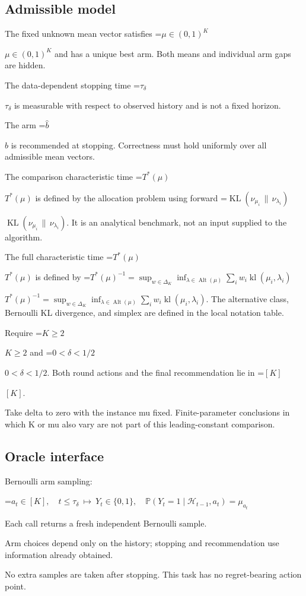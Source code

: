 \documentclass[10pt,a4paper]{article}
\newcommand{\AtlasMath}[1]{\par\begingroup\centering\setbox0=\hbox{$\displaystyle #1$}\ifdim\wd0>1.4\linewidth\typeout{ATLAS WIDE FORMULA: \the\wd0}\fi\ifdim\wd0>\linewidth\resizebox{\linewidth}{!}{\box0}\else\box0\fi\par\endgroup}
\newcommand{\AtlasInlineMath}[1]{\begingroup\setbox0=\hbox{$#1$}\ifdim\wd0>.4\linewidth\endgroup\AtlasMath{#1}\else\endgroup$#1$\fi}
\begin{document}
\subsection{Admissible model}
The fixed unknown mean vector satisfies \AtlasInlineMath{\mu\in(0,1)^K} and has a unique best arm. Both means and individual arm gaps are hidden.

The data-dependent stopping time \AtlasInlineMath{\tau_\delta} is measurable with respect to observed history and is not a fixed horizon.

The arm \AtlasInlineMath{\widehat{b}} is recommended at stopping. Correctness must hold uniformly over all admissible mean vectors.

The comparison characteristic time \AtlasInlineMath{T^*(\mu)} is defined by the allocation problem using forward \AtlasInlineMath{\operatorname{KL}(\nu_{\mu_i}\,\|\,\nu_{\lambda_i})}. It is an analytical benchmark, not an input supplied to the algorithm.

The full characteristic time \AtlasInlineMath{T^*(\mu)} is defined by \AtlasInlineMath{T^*(\mu)^{-1}=\sup_{w\in\Delta_K}\inf_{\lambda\in\operatorname{Alt}(\mu)}\sum_i w_i\operatorname{kl}(\mu_i,\lambda_i)}. The alternative class, Bernoulli KL divergence, and simplex are defined in the local notation table.

Require \AtlasInlineMath{K\ge2} and \AtlasInlineMath{0<\delta<1/2}. Both round actions and the final recommendation lie in \AtlasInlineMath{[K]}.

Take delta to zero with the instance mu fixed. Finite-parameter conclusions in which K or mu also vary are not part of this leading-constant comparison.

\subsection{Oracle interface}
Bernoulli arm sampling:


\AtlasMath{a_t\in[K],\quad t\le\tau_\delta\ \longmapsto\ Y_t\in\{0,1\},\quad \mathbb{P}(Y_t=1\mid\mathcal{H}_{t-1},a_t)=\mu_{a_t}}


Each call returns a fresh independent Bernoulli sample.

Arm choices depend only on the history; stopping and recommendation use information already obtained.

No extra samples are taken after stopping. This task has no regret-bearing action point.
\end{document}
